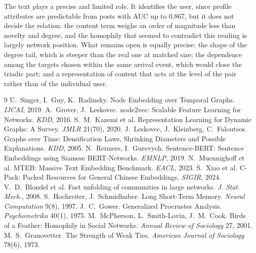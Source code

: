 \documentclass[11pt,a4paper]{article}
\begin{document}
The text plays a precise and limited role. It identifies the user, since profile attributes are
predictable from posts with AUC up to 0.867, but it does not decide the relation: the content term
weighs an order of magnitude less than novelty and degree, and the homophily that seemed to contradict this reading is
largely network position. What remains open is equally precise: the shape of the degree tail, which is
steeper than the real one at matched size; the dependence among the targets chosen within the same
arrival event, which would close the triadic part; and a representation of content that acts at the level
of the pair rather than of the individual user.

\begin{thebibliography}{9}
\small
{} U.~Singer, I.~Guy, K.~Radinsky. Node Embedding over Temporal Graphs. \emph{IJCAI}, 2019.
 A.~Grover, J.~Leskovec. node2vec: Scalable Feature Learning for Networks. \emph{KDD}, 2016.
 S.~M.~Kazemi et al. Representation Learning for Dynamic Graphs: A Survey. \emph{JMLR} 21(70), 2020.
 J.~Leskovec, J.~Kleinberg, C.~Faloutsos. Graphs over Time: Densification Laws, Shrinking Diameters and Possible Explanations. \emph{KDD}, 2005.
 N.~Reimers, I.~Gurevych. Sentence-BERT: Sentence Embeddings using Siamese BERT-Networks. \emph{EMNLP}, 2019.
 N.~Muennighoff et al. MTEB: Massive Text Embedding Benchmark. \emph{EACL}, 2023.
 S.~Xiao et al. C-Pack: Packed Resources for General Chinese Embeddings. \emph{SIGIR}, 2024.
 V.~D.~Blondel et al. Fast unfolding of communities in large networks. \emph{J. Stat. Mech.}, 2008.
 S.~Hochreiter, J.~Schmidhuber. Long Short-Term Memory. \emph{Neural Computation} 9(8), 1997.
 J.~C.~Gower. Generalized Procrustes Analysis. \emph{Psychometrika} 40(1), 1975.
 M.~McPherson, L.~Smith-Lovin, J.~M.~Cook. Birds of a Feather: Homophily in Social Networks. \emph{Annual Review of Sociology} 27, 2001.
 M.~S.~Granovetter. The Strength of Weak Ties. \emph{American Journal of Sociology} 78(6), 1973.
\end{thebibliography}
\end{document}
